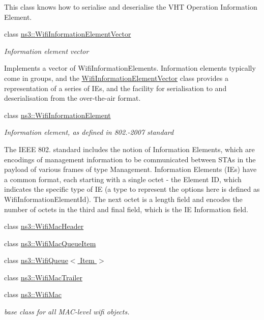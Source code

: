 \begin{DoxyCompactItemize}
\begin{DoxyCompactList}
This class knows how to serialise and deserialise the V\+HT Operation Information Element. \end{DoxyCompactList}\item 
class \hyperlink{classns3_1_1WifiInformationElementVector}{ns3\+::\+Wifi\+Information\+Element\+Vector}
\begin{DoxyCompactList}\small\item\em Information element vector

Implements a vector of Wifi\+Information\+Elements. Information elements typically come in groups, and the \hyperlink{classns3_1_1WifiInformationElementVector}{Wifi\+Information\+Element\+Vector} class provides a representation of a series of I\+Es, and the facility for serialisation to and deserialisation from the over-\/the-\/air format. \end{DoxyCompactList}\item 
class \hyperlink{classns3_1_1WifiInformationElement}{ns3\+::\+Wifi\+Information\+Element}
\begin{DoxyCompactList}\small\item\em Information element, as defined in 802.-\/2007 standard

The I\+E\+EE 802. standard includes the notion of Information Elements, which are encodings of management information to be communicated between S\+T\+As in the payload of various frames of type Management. Information Elements (I\+Es) have a common format, each starting with a single octet -\/ the Element ID, which indicates the specific type of IE (a type to represent the options here is defined as Wifi\+Information\+Element\+Id). The next octet is a length field and encodes the number of octets in the third and final field, which is the IE Information field. \end{DoxyCompactList}\item 
class \hyperlink{classns3_1_1WifiMacHeader}{ns3\+::\+Wifi\+Mac\+Header}
\item 
class \hyperlink{classns3_1_1WifiMacQueueItem}{ns3\+::\+Wifi\+Mac\+Queue\+Item}
\item 
class \hyperlink{classns3_1_1WifiQueue}{ns3\+::\+Wifi\+Queue$<$ Item $>$}
\item 
class \hyperlink{classns3_1_1WifiMacTrailer}{ns3\+::\+Wifi\+Mac\+Trailer}
\item 
class \hyperlink{classns3_1_1WifiMac}{ns3\+::\+Wifi\+Mac}
\begin{DoxyCompactList}\small\item\em base class for all M\+A\+C-\/level wifi objects.


\end{DoxyCompactList}
\end{DoxyCompactItemize}
